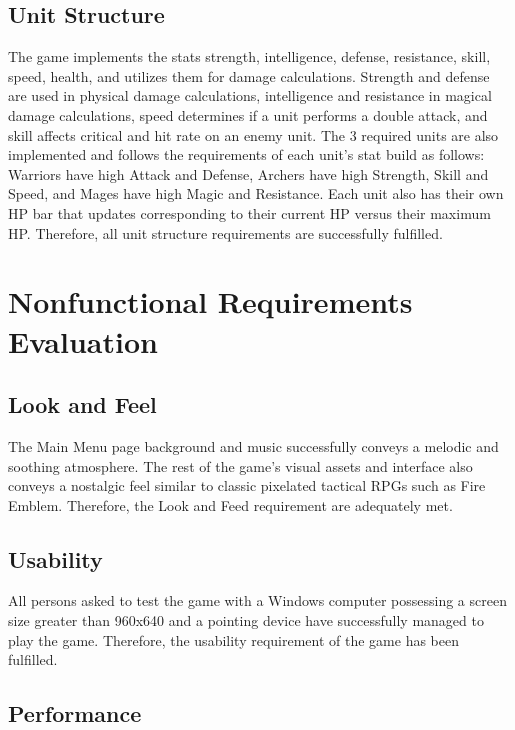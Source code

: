 \documentclass{article}
\begin{document}
\subsection{Unit Structure}

The game implements the stats strength, intelligence, defense, resistance, skill, speed, health, and utilizes them for damage calculations. Strength and defense are used in physical damage calculations, intelligence and resistance in magical damage calculations, speed determines if a unit performs a double attack, and skill affects critical and hit rate on an enemy unit. The 3 required units are also implemented and follows the requirements of each unit's stat build as follows: Warriors have high Attack and Defense, Archers have high Strength, Skill and Speed, and Mages have high Magic and Resistance. Each unit also has their own HP bar that updates corresponding to their current HP versus their maximum HP. Therefore, all unit structure requirements are successfully fulfilled.

\section{Nonfunctional Requirements Evaluation}

\subsection{Look and Feel}

The Main Menu page background and music successfully conveys a melodic and soothing atmosphere. The rest of the game's visual assets and interface also conveys a nostalgic feel similar to classic pixelated tactical RPGs such as Fire Emblem. Therefore, the Look and Feed requirement are adequately met. 

\subsection{Usability}

All persons asked to test the game with a Windows computer possessing a screen size greater than 960x640 and a pointing device have successfully managed to play the game. Therefore, the usability requirement of the game has been fulfilled.

\subsection{Performance}
\end{document}
